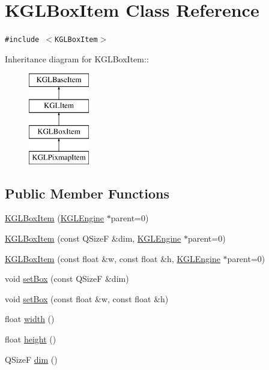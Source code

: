 \hypertarget{class_k_g_l_box_item}{
\section{KGLBoxItem Class Reference}
\label{class_k_g_l_box_item}
}
{\tt \#include $<$KGLBoxItem$>$}

Inheritance diagram for KGLBoxItem::\begin{figure}[H]
\begin{center}
\leavevmode
\includegraphics[height=4cm]{class_k_g_l_box_item}
\end{center}
\end{figure}
\subsection*{Public Member Functions}
\begin{CompactItemize}
\item 
\hyperlink{class_k_g_l_box_item_5c992045e6437b80c34fad9ac41f7dcc}{KGLBoxItem} (\hyperlink{class_k_g_l_engine}{KGLEngine} $\ast$parent=0)
\item 
\hyperlink{class_k_g_l_box_item_a9007cf09702c340fa0b8b5a38316977}{KGLBoxItem} (const QSizeF \&dim, \hyperlink{class_k_g_l_engine}{KGLEngine} $\ast$parent=0)
\item 
\hyperlink{class_k_g_l_box_item_e8f3c118be13227998e02c7bf52bb2e1}{KGLBoxItem} (const float \&w, const float \&h, \hyperlink{class_k_g_l_engine}{KGLEngine} $\ast$parent=0)
\item 
void \hyperlink{class_k_g_l_box_item_e983873270edf0132bc4fbb1eee53606}{setBox} (const QSizeF \&dim)
\item 
void \hyperlink{class_k_g_l_box_item_96c4d0f12d06c3c8cc3d2c2d5ba0e44c}{setBox} (const float \&w, const float \&h)
\item 
float \hyperlink{class_k_g_l_box_item_ca8cc8587d49d4b85a1a3b6b0a1c9181}{width} ()
\item 
float \hyperlink{class_k_g_l_box_item_668f856b6462b6bd10ca356a58592f2a}{height} ()
\item 
QSizeF \hyperlink{class_k_g_l_box_item_33d9cd4a618b16d5679b53705be1f202}{dim} ()
\end{CompactItemize}
